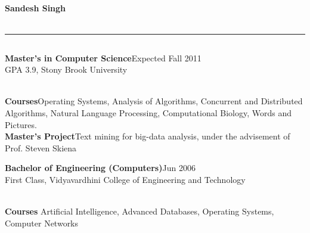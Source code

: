 \documentclass[a4paper,11pt,final]{article}
\newcommand{\resumetitle}[1]{%
  \subsection*{%
    \Large\sc{\textbf{#1}}%
  }%

}%
\newcommand{\eduexp}[3]{%
\noindent\textbf{#1}\hfill{#2}\normalsize\\{#3}\vspace{3pt}%
}
\newcommand{\resumedescheader}[1]{%
  \bigskip
  \resumetitle{#1}
}%
\begin{document}
\pagestyle{empty}

\begin{center}
  \centering\Large\textbf{Sandesh Singh}\normalsize \\
   \\
  \rule[2pt]{0.99\linewidth}{.1pt}
\end{center}

\vspace{-20pt}
\resumedescheader{Education}
\eduexp
	{Master's in Computer Science}
	{Expected Fall 2011}
	{GPA 3.9, Stony Brook University}
\\ \noindent \textbf{Courses}\quad Operating Systems, Analysis of Algorithms, Concurrent and Distributed Algorithms, Natural Language Processing, Computational Biology, Words and Pictures.
\\ \noindent \textbf{Master's Project}\quad Text mining for big-data analysis, under the advisement of Prof. Steven Skiena
\\
\vspace{-5pt}

\eduexp
	{Bachelor of Engineering (Computers)}
	{Jun 2006}
	{First Class, Vidyavardhini College of Engineering and Technology}
\\ \noindent \textbf{Courses} Artificial Intelligence, Advanced Databases, Operating Systems, Computer Networks
\end{document}
